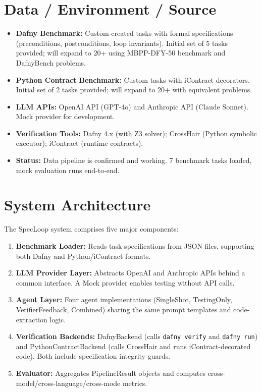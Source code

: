 \documentclass[11pt,a4paper]{article}
\begin{document}
\section{Data / Environment / Source}

\begin{itemize}[noitemsep]
    \item \textbf{Dafny Benchmark:} Custom-created tasks with formal specifications (preconditions, postconditions, loop invariants). Initial set of 5 tasks provided; will expand to 20+ using MBPP-DFY-50 benchmark \cite{dafnybench2025} and DafnyBench \cite{dafnybench2025} problems.
    \item \textbf{Python Contract Benchmark:} Custom tasks with iContract decorators. Initial set of 2 tasks provided; will expand to 20+ with equivalent problems.
    \item \textbf{LLM APIs:} OpenAI API (GPT-4o) and Anthropic API (Claude Sonnet). Mock provider for development.
    \item \textbf{Verification Tools:} Dafny 4.x (with Z3 solver); CrossHair (Python symbolic executor); iContract (runtime contracts).
    \item \textbf{Status:} Data pipeline is confirmed and working. 7 benchmark tasks loaded, mock evaluation runs end-to-end.
\end{itemize}

\section{System Architecture}

The SpecLoop system comprises five major components:

\begin{enumerate}[noitemsep]
    \item \textbf{Benchmark Loader:} Reads task specifications from JSON files, supporting both Dafny and Python/iContract formats.
    \item \textbf{LLM Provider Layer:} Abstracts OpenAI and Anthropic APIs behind a common interface. A Mock provider enables testing without API calls.
    \item \textbf{Agent Layer:} Four agent implementations (SingleShot, TestingOnly, VerifierFeedback, Combined) sharing the same prompt templates and code-extraction logic.
    \item \textbf{Verification Backends:} DafnyBackend (calls \texttt{dafny verify} and \texttt{dafny run}) and PythonContractBackend (calls CrossHair and runs iContract-decorated code). Both include specification integrity guards.
    \item \textbf{Evaluator:} Aggregates PipelineResult objects and computes cross-model/cross-language/cross-mode metrics.
\end{enumerate}
\end{document}
